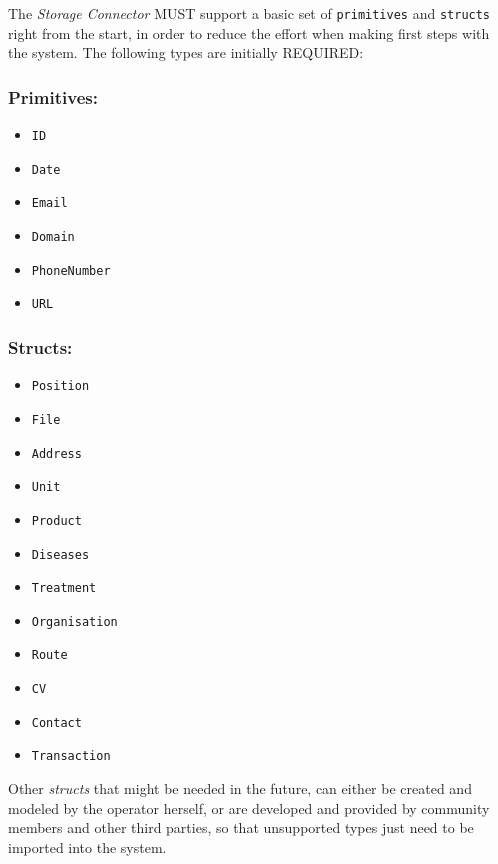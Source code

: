 \documentclass[12pt,english,a4paper,titlepage,cleardoublepage=empty,dottedtoc]{report}
\providecommand{\tightlist}{%
  \setlength{\itemsep}{0pt}\setlength{\parskip}{0pt}}
\begin{document}
The \emph{Storage Connector} MUST support a basic set of
\texttt{primitives} and \texttt{structs} right from the start, in order
to reduce the effort when making first steps with the system. The
following types are initially REQUIRED:

\subsubsection*{Primitives:}\label{primitives}

\begin{itemize}
\tightlist
\item
  \texttt{ID}
\item
  \texttt{Date}
\item
  \texttt{Email}
\item
  \texttt{Domain}
\item
  \texttt{PhoneNumber}
\item
  \texttt{URL}
\end{itemize}

\subsubsection*{Structs:}\label{structs}

\begin{itemize}
\tightlist
\item
  \texttt{Position}
\item
  \texttt{File}
\item
  \texttt{Address}
\item
  \texttt{Unit}
\item
  \texttt{Product}
\item
  \texttt{Diseases}
\item
  \texttt{Treatment}
\item
  \texttt{Organisation}
\item
  \texttt{Route}
\item
  \texttt{CV}
\item
  \texttt{Contact}
\item
  \texttt{Transaction}
\end{itemize}

Other \emph{structs} that might be needed in the future, can either be
created and modeled by the operator herself, or are developed and
provided by community members and other third parties, so that
unsupported types just need to be imported into the system.
\end{document}
